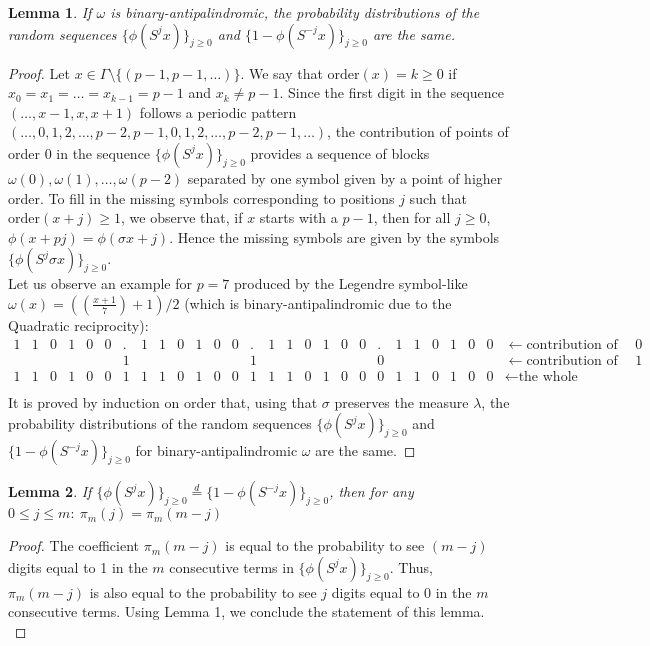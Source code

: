 \documentclass[a4paper]{article}
\theoremstyle{plain}
\newtheorem{lemma}{Lemma}
\theoremstyle{definition}
\begin{document}
\begin{lemma}
If $\omega$ is binary-antipalindromic, the probability distributions of the random sequences $\{\phi(S^j x)\}_{j \ge 0}$ and $\{ 1 - \phi(S^{-j} x)\}_{j \ge 0}$ are the same.
\end{lemma}
\begin{proof}
Let $x \in \Gamma \setminus \{(p-1,p-1,\ldots)\}$. We
say that $\mathrm{order}(x) = k \ge 0$ if $x_0=x_1=\ldots=x_{k-1}=p-1$ and $x_k \ne p-1$.
Since the first digit in the sequence $(\ldots, x-1,x,x+1)$ follows a periodic pattern
$(\ldots, 0, 1, 2, \ldots,p-2, p-1, 0, 1, 2, \ldots,p-2, p-1, \ldots)$, the contribution of points of order $0$ in the sequence
$\{\phi(S^j x)\}_{j \ge 0}$ provides a sequence of blocks $\omega(0),\omega(1),\ldots, \omega(p-2)$ separated by one symbol
given by a point of higher order. To fill in the missing symbols corresponding to positions $j$ 
such that $\mathrm{order}(x+j) \ge 1$, we observe that, if $x$ starts with a $p-1$, then for all $j \ge 0$, $\phi(x+pj)=\phi(\sigma x + j)$. Hence the missing symbols are given by the symbols $\{\phi(S^j \sigma x)\}_{j \ge 0}$.\\
Let us observe an example for $p=7$ produced by the Legendre symbol-like $\omega(x)=((\frac{x+1}{7}) + 1)/2$ (which is binary-antipalindromic due to the Quadratic reciprocity):\bigskip\\
$\begin{array}{cccccccccccccccccccccccccccl}
1 & 1 & 0 & 1 & 0 & 0 & . & 1 & 1 & 0 & 1 & 0 & 0 &. & 1 & 1 & 0 & 1 & 0 & 0 & . & 1 & 1 & 0 & 1 & 0 & 0 &\leftarrow \text{contribution of order }0 \\
  &   &   &   &   &   & 1 &   &   &   &   &   &   &1 &   &   &   &   &   &   & 0 &   &   &   &   &   &   &\leftarrow \text{contribution of order }1 \\
1 & 1 & 0 & 1 & 0 & 0 & 1 & 1 & 1 & 0 & 1 & 0 & 0 & 1 & 1 & 1 & 0 & 1 & 0 & 0 & 0 & 1 & 1 & 0 & 1 & 0 & 0 &\leftarrow \text{the whole sequence} \\
\end{array}$
\bigskip\\
It is proved by induction on order that, using that $\sigma$ preserves the measure $\lambda$, the probability distributions of the random sequences $\{\phi(S^j x)\}_{j \ge 0}$ and $\{ 1 - \phi(S^{-j} x)\}_{j \ge 0}$ for binary-antipalindromic $\omega$ are the same.
\end{proof}
\begin{lemma}
If $\{\phi(S^j x)\}_{j \ge 0} \overset{d}{=} \{ 1 - \phi(S^{-j} x)\}_{j \ge 0}$, then for any $0 \le j \le m:\ \pi_m(j)=\pi_m(m-j)$
\end{lemma}
\begin{proof}
The coefficient $\pi_m(m-j)$ is equal to the probability to see $(m-j)$ digits equal to 1 in the $m$ consecutive terms in $\{\phi(S^j x)\}_{j \ge 0}$. Thus, $\pi_m(m-j)$ is also equal to the probability to see $j$ digits equal to $0$ in the $m$ consecutive terms. Using Lemma 1, we conclude the statement of this lemma.\\
\end{proof}
\end{document}
